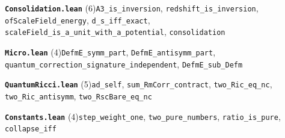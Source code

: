 \documentclass[11pt,a4paper]{article}
\theoremstyle{sudef}
\begin{document}
\noindent\textbf{\texttt{Consolidation.lean}} (6)\quad \texttt{A3\_\allowbreak is\_\allowbreak inversion}, \texttt{redshift\_\allowbreak is\_\allowbreak inversion}, \texttt{ofScaleField\_\allowbreak energy}, \texttt{d\_\allowbreak s\_\allowbreak iff\_\allowbreak exact}, \texttt{scaleField\_\allowbreak is\_\allowbreak a\_\allowbreak unit\_\allowbreak with\_\allowbreak a\_\allowbreak potential}, \texttt{consolidation}\par\smallskip
\noindent\textbf{\texttt{Micro.lean}} (4)\quad \texttt{DefmE\_\allowbreak symm\_\allowbreak part}, \texttt{DefmE\_\allowbreak antisymm\_\allowbreak part}, \texttt{quantum\_\allowbreak correction\_\allowbreak signature\_\allowbreak independent}, \texttt{DefmE\_\allowbreak sub\_\allowbreak Defm}\par\smallskip
\noindent\textbf{\texttt{QuantumRicci.lean}} (5)\quad \texttt{ad\_\allowbreak self}, \texttt{sum\_\allowbreak RmCorr\_\allowbreak contract}, \texttt{two\_\allowbreak Ric\_\allowbreak eq\_\allowbreak nc}, \texttt{two\_\allowbreak Ric\_\allowbreak antisymm}, \texttt{two\_\allowbreak RscBare\_\allowbreak eq\_\allowbreak nc}\par\smallskip
\noindent\textbf{\texttt{Constants.lean}} (4)\quad \texttt{step\_\allowbreak weight\_\allowbreak one}, \texttt{two\_\allowbreak pure\_\allowbreak numbers}, \texttt{ratio\_\allowbreak is\_\allowbreak pure}, \texttt{collapse\_\allowbreak iff}\par\smallskip
\end{document}
